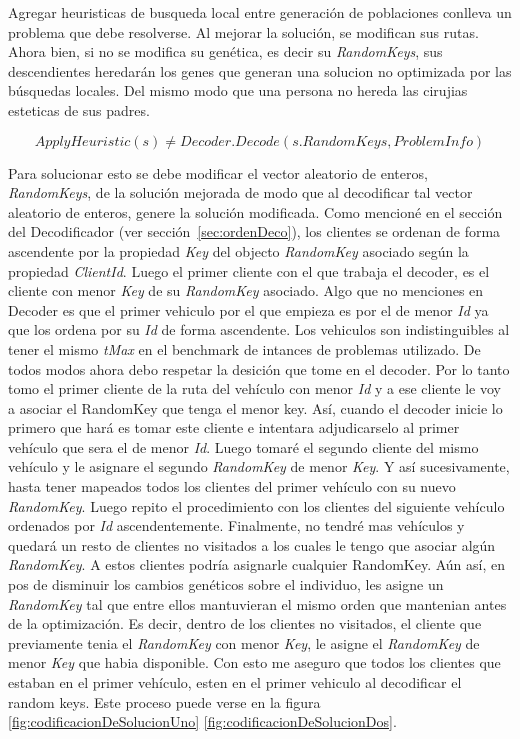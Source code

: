 Agregar heuristicas de busqueda local entre generación de poblaciones conlleva un problema que debe resolverse. Al mejorar la solución, se modifican sus rutas. Ahora bien, si no se modifica su genética, es decir su \textit{RandomKeys}, sus descendientes heredarán los genes que generan una solucion no optimizada por las búsquedas locales. Del mismo modo que una persona no hereda las cirujias esteticas de sus padres. 

\begin{equation*}
ApplyHeuristic(s) \neq Decoder.Decode(s.RandomKeys, ProblemInfo)
\end{equation*}

Para solucionar esto se debe modificar el vector aleatorio de enteros, \textit{RandomKeys}, de la solución mejorada de modo que al decodificar tal vector aleatorio de enteros, genere la solución modificada. Como mencioné en el sección del Decodificador (ver sección~\ref{sec:ordenDeco}), los clientes se ordenan de forma ascendente por la propiedad \textit{Key} del objecto \textit{RandomKey} asociado según la propiedad \textit{ClientId}. Luego el primer cliente con el que trabaja el decoder, es el cliente con menor \textit{Key} de su \textit{RandomKey} asociado. Algo que no menciones en Decoder es que el primer vehiculo por el que empieza es por el de menor \textit{Id} ya que los ordena por su \textit{Id} de forma ascendente. Los vehiculos son indistinguibles al tener el mismo \textit{tMax} en el benchmark de intances de problemas utilizado. De todos modos ahora debo respetar la desición que tome en el decoder. Por lo tanto tomo el primer cliente de la ruta del vehículo con menor \textit{Id} y a ese cliente le voy a asociar el {RandomKey} que tenga el menor key. Así, cuando el decoder inicie lo primero que hará es tomar este cliente e intentara adjudicarselo al primer vehículo que sera el de menor \textit{Id}. Luego tomaré el segundo cliente del mismo vehículo y le asignare el segundo \textit{RandomKey} de menor \textit{Key}. Y así sucesivamente, hasta tener mapeados todos los clientes del primer vehículo con su nuevo \textit{RandomKey}. Luego repito el procedimiento con los clientes del siguiente vehículo ordenados por \textit{Id} ascendentemente. Finalmente, no tendré mas vehículos y quedará un resto de clientes no visitados a los cuales le tengo que asociar algún \textit{RandomKey}. A estos clientes podría asignarle cualquier RandomKey. Aún así, en pos de disminuir los cambios genéticos sobre el individuo, les asigne un \textit{RandomKey} tal que entre ellos mantuvieran el mismo orden que mantenian antes de la optimización. Es decir, dentro de los clientes no visitados, el cliente que previamente tenia el \textit{RandomKey} con menor \textit{Key}, le asigne el \textit{RandomKey} de menor \textit{Key} que habia disponible. Con esto me aseguro que todos los clientes que estaban en el primer vehículo, esten en el primer vehiculo al decodificar el random keys. Este proceso puede verse en la figura \ref{fig:codificacionDeSolucionUno} \ref{fig:codificacionDeSolucionDos}.

